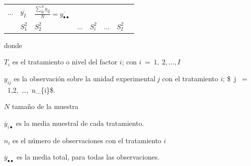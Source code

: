 \documentclass[]{book}
\theoremstyle{definition}
\theoremstyle{definition}
\theoremstyle{definition}
\theoremstyle{remark}
\begin{document}
\begin{longtable}[]{@{}llllllll@{}}
\begin{minipage}[t]{0.02\columnwidth}
\(\ldots\)\strut
\end{minipage} & \begin{minipage}[t]{0.11\columnwidth}\raggedright
\(\overline{y_{I.}}\)\strut
\end{minipage} & \begin{minipage}[t]{0.22\columnwidth}\raggedright
\(\frac{\sum_{i\mathbf{j}}^{N}y_{i\mathbf{j}}}{N} = \overline{y_{\bullet\bullet}}\)\strut
\end{minipage}\tabularnewline
\begin{minipage}[t]{0.11\columnwidth}\raggedright
\strut
\end{minipage} & \begin{minipage}[t]{0.09\columnwidth}\raggedright
\(S_{1}^{2}\)\strut
\end{minipage} & \begin{minipage}[t]{0.09\columnwidth}\raggedright
\(S_{2}^{2}\)\strut
\end{minipage} & \begin{minipage}[t]{0.02\columnwidth}\raggedright
\(\ldots\)\strut
\end{minipage} & \begin{minipage}[t]{0.11\columnwidth}\raggedright
\(S_{i}^{2}\)\strut
\end{minipage} & \begin{minipage}[t]{0.02\columnwidth}\raggedright
\(\ldots\)\strut
\end{minipage} & \begin{minipage}[t]{0.11\columnwidth}\raggedright
\(S_{I}^{2}\)\strut
\end{minipage} & \begin{minipage}[t]{0.22\columnwidth}\raggedright
\strut
\end{minipage}\tabularnewline
\bottomrule
\end{longtable}

donde

\(T_{i}\) es el tratamiento o nivel del factor \(i\); con
\(i\  = \ 1,\ 2,\ldots,I\)

\(y_{ij}\) es la observación sobre la unidad experimental\(\ j\) con el
tratamiento \(i\); \$~j~ = ~1,2,~\ldots,~n\_\{i\}\$.

\(N\) tamaño de la muestra

\({\overline{y}}_{i \bullet}\) es la media muestral de cada tratamiento.

\(n_{i}\) es el número de observaciones con el tratamiento \(i\)

\({\overline{y}}_{\bullet \bullet}\) es la media total, para todas las
observaciones.
\end{document}
